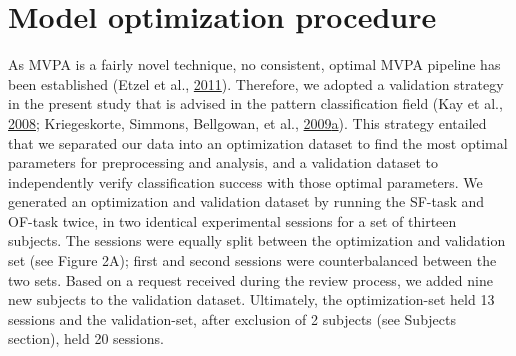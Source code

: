 \documentclass[12pt,american,a4paper,oneside,]{memoir} %
\begin{document}
\hypertarget{shared-states-methods-model-optimization-procedure}{%
\section{Model optimization procedure}\label{shared-states-methods-model-optimization-procedure}}

As MVPA is a fairly novel technique, no consistent, optimal MVPA pipeline has been established (Etzel et al., \protect\hyperlink{ref-etzel2011impact}{2011}). Therefore, we adopted a validation strategy in the present study that is advised in the pattern classification field (Kay et al., \protect\hyperlink{ref-kay2008identifying}{2008}; Kriegeskorte, Simmons, Bellgowan, et al., \protect\hyperlink{ref-kriegeskorte2009circular}{2009}\protect\hyperlink{ref-kriegeskorte2009circular}{a}). This strategy entailed that we separated our data into an optimization dataset to find the most optimal parameters for preprocessing and analysis, and a validation dataset to independently verify classification success with those optimal parameters. We generated an optimization and validation dataset by running the SF-task and OF-task twice, in two identical experimental sessions for a set of thirteen subjects. The sessions were equally split between the optimization and validation set (see Figure 2A); first and second sessions were counterbalanced between the two sets. Based on a request received during the review process, we added nine new subjects to the validation dataset. Ultimately, the optimization-set held 13 sessions and the validation-set, after exclusion of 2 subjects (see Subjects section), held 20 sessions.
\end{document}
